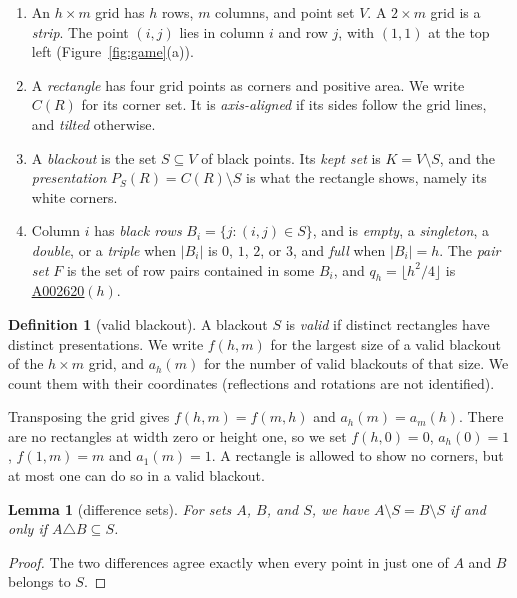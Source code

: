 \documentclass[12pt]{article}
\theoremstyle{plain}
\newtheorem{lemma}[theorem]{Lemma}
\theoremstyle{definition}
\newtheorem{definition}[theorem]{Definition}
\theoremstyle{remark}
\newcommand{\seqnum}[1]{\href{https://oeis.org/#1}{\rm \underline{#1}}}
\newcommand{\pres}{P_S}
\begin{document}
\begin{enumerate}[(1),leftmargin=*]
\item An $h\times m$ grid has $h$ rows, $m$ columns, and point set $V$. A $2\times m$ grid
is a \emph{strip}. The point $(i,j)$ lies in column $i$ and row $j$, with $(1,1)$ at the
top left (Figure~\ref{fig:game}(a)).
\item A \emph{rectangle} has four grid points as corners and positive area.
We write $C(R)$ for its corner set. It is \emph{axis-aligned} if its sides
follow the grid lines, and \emph{tilted} otherwise.
\item A \emph{blackout} is the set $S\subseteq V$ of black points. Its
\emph{kept set} is $K=V\setminus S$, and the \emph{presentation}
$\pres(R)=C(R)\setminus S$ is what the rectangle shows, namely its white corners.
\item Column $i$ has \emph{black rows} $B_i=\{j:(i,j)\in S\}$, and is \emph{empty}, a
\emph{singleton}, a \emph{double}, or a \emph{triple} when $|B_i|$ is $0$, $1$, $2$, or
$3$, and \emph{full} when $|B_i|=h$. The \emph{pair set} $F$ is the set of row pairs
contained in some $B_i$, and $q_h=\lfloor h^2/4\rfloor$ is \seqnum{A002620}$(h)$.
\end{enumerate}

\begin{definition}[valid blackout]\label{def:valid}
A blackout $S$ is \emph{valid} if distinct rectangles have distinct
presentations. We write $f(h,m)$ for the largest size of a valid blackout
of the $h\times m$ grid, and $a_h(m)$ for the number of valid blackouts of that
size. We count them with their coordinates (reflections and rotations are
not identified).
\end{definition}

Transposing the grid gives $f(h,m)=f(m,h)$ and $a_h(m)=a_m(h)$.
There are no rectangles at width zero or height one, so we set
$f(h,0)=0$, $a_h(0)=1$, $f(1,m)=m$ and $a_1(m)=1$. A rectangle is allowed
to show no corners, but at most one can do so in a valid blackout.

\begin{lemma}[difference sets]\label{lem:diff}
For sets $A$, $B$, and $S$, we have $A\setminus S=B\setminus S$ if and only if
$A\triangle B\subseteq S$.
\end{lemma}

\begin{proof}
The two differences agree exactly when every point in just one of $A$ and $B$
belongs to $S$.
\end{proof}
\end{document}
